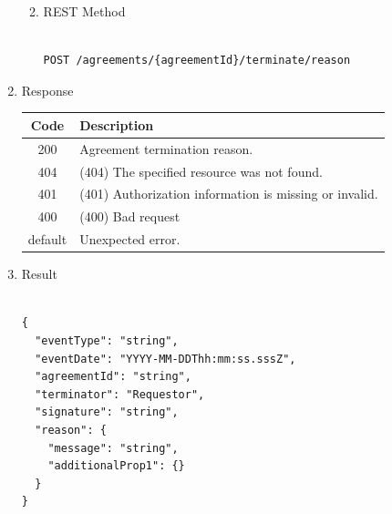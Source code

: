 \begin{enumerate}
\begin{enumerate}
\begin{table}[H]
\end{table}

\item REST Method

\begin{tcolorbox}[boxrule=0pt, frame empty]
\begin{verbatim} 

POST /agreements/{agreementId}/terminate/reason

\end{verbatim}
\end{tcolorbox}

\end{enumerate}

\item Response

\begin{table}[H]
\footnotesize

\begin{center}
\begin{tabular}{|c|l|} 
\hline
\rowcolor{lightgray}	Code 		& 	Description \\
\hline
200	 		&	Agreement termination reason. \\
\hline
404			&	(404) The specified resource was not found. \\
\hline
401			&	(401) Authorization information is missing or invalid. \\
\hline
400			&	(400) Bad request \\
\hline
default		&	Unexpected error. \\
\hline
\end{tabular}
\end{center}

\end{table}

\item Result

\begin{tcolorbox}[boxrule=0pt, frame empty]
\begin{verbatim}

{
  "eventType": "string",
  "eventDate": "YYYY-MM-DDThh:mm:ss.sssZ",
  "agreementId": "string",
  "terminator": "Requestor",
  "signature": "string",
  "reason": {
    "message": "string",
    "additionalProp1": {}
  }
}

\end{verbatim}
\end{tcolorbox}

\begin{table}[H]
\footnotesize


\end{table}
\end{enumerate}

